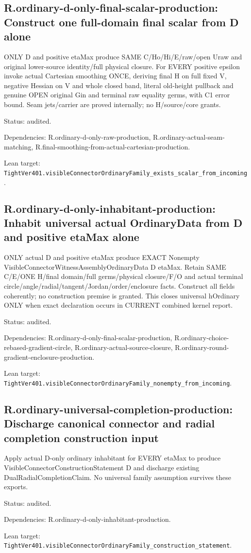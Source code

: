 \documentclass{article}
\begin{document}
\subsection*{R.ordinary-d-only-final-scalar-production: Construct one full-domain final scalar from D alone}
ONLY D and positive etaMax produce SAME C/Ho/Hi/E/raw/open Uraw and original lower-source identity/full physical closure. For EVERY positive epsilon invoke actual Cartesian smoothing ONCE, deriving final H on full fixed V, negative Hessian on V and whole closed band, literal old-height pullback and genuine OPEN original Gin and terminal raw equality germs, with C1 error bound. Seam jets/carrier are proved internally; no H/source/core grants.
\par Status: audited.
\par Dependencies: R.ordinary-d-only-raw-production, R.ordinary-actual-seam-matching, R.final-smoothing-from-actual-cartesian-production.
\par Lean target: \texttt{TightVer401.visibleConnectorOrdinaryFamily\_exists\_scalar\_from\_incoming}.
\subsection*{R.ordinary-d-only-inhabitant-production: Inhabit universal actual OrdinaryData from D and positive etaMax alone}
ONLY actual D and positive etaMax produce EXACT Nonempty VisibleConnectorWitnessAssemblyOrdinaryData D etaMax. Retain SAME C/E/ONE H/final domain/full germs/physical closure/F/O and actual terminal circle/angle/radial/tangent/Jordan/order/enclosure facts. Construct all fields coherently; no construction premise is granted. This closes universal hOrdinary ONLY when exact declaration occurs in CURRENT combined kernel report.
\par Status: audited.
\par Dependencies: R.ordinary-d-only-final-scalar-production, R.ordinary-choice-rebased-gradient-circle, R.ordinary-actual-source-closure, R.ordinary-round-gradient-enclosure-production.
\par Lean target: \texttt{TightVer401.visibleConnectorOrdinaryFamily\_nonempty\_from\_incoming}.
\subsection*{R.ordinary-universal-completion-production: Discharge canonical connector and radial completion construction input}
Apply actual D-only ordinary inhabitant for EVERY etaMax to produce VisibleConnectorConstructionStatement D and discharge existing DualRadialCompletionClaim. No universal family assumption survives these exports.
\par Status: audited.
\par Dependencies: R.ordinary-d-only-inhabitant-production.
\par Lean target: \texttt{TightVer401.visibleConnectorOrdinaryFamily\_construction\_statement}.
\end{document}
